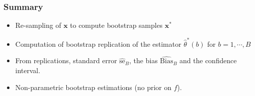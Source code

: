 


%
%



\frame
{
\frametitle{Summary}
\begin{itemize}
\item Re-sampling of $\mathbf{x}$ to compute bootstrap samples $\mathbf{x}^{*}$ \item Computation of bootstrap replication of the estimator $\hat{\theta}^{*}(b)$ for $b=1,\cdots,B$
\item From replications,  standard error $\widehat{\mathrm{se}}_{B}$, the bias $\widehat{\mathrm{Bias}}_{B}$ and the  confidence interval. 
\item Non-parametric bootstrap estimations (no prior on $f$).
\end{itemize}
}
